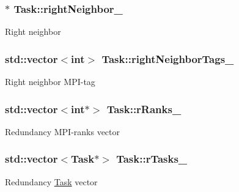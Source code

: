 \subsubsection[{\texorpdfstring{right\+Neighbor\+\_\+}{rightNeighbor_}}]{$\ast$ Task\+::right\+Neighbor\+\_\+\hspace{0.3cm}{\ttfamily [private]}}\hypertarget{classTask_aa6d859faf14ed3e950923562dba9d848}{}\label{classTask_aa6d859faf14ed3e950923562dba9d848}
Right neighbor 
\subsubsection[{\texorpdfstring{right\+Neighbor\+Tags\+\_\+}{rightNeighborTags_}}]{\setlength{\rightskip}{0pt plus 5cm}std\+::vector$<$int$>$ Task\+::right\+Neighbor\+Tags\+\_\+\hspace{0.3cm}{\ttfamily [private]}}\hypertarget{classTask_a3a426a21f7ba4c4f91479207f96d6a66}{}\label{classTask_a3a426a21f7ba4c4f91479207f96d6a66}
Right neighbor M\+P\+I-\/tag 
\subsubsection[{\texorpdfstring{r\+Ranks\+\_\+}{rRanks_}}]{\setlength{\rightskip}{0pt plus 5cm}std\+::vector$<$int$\ast$$>$ Task\+::r\+Ranks\+\_\+\hspace{0.3cm}{\ttfamily [private]}}\hypertarget{classTask_a0770f08a9273b858cdcc8c4555fa0291}{}\label{classTask_a0770f08a9273b858cdcc8c4555fa0291}
Redundancy M\+P\+I-\/ranks vector 
\subsubsection[{\texorpdfstring{r\+Tasks\+\_\+}{rTasks_}}]{\setlength{\rightskip}{0pt plus 5cm}std\+::vector$<${\bf Task}$\ast$$>$ Task\+::r\+Tasks\+\_\+\hspace{0.3cm}{\ttfamily [private]}}\hypertarget{classTask_a4a6d7ba7f0f194053af5ff7ca236f761}{}\label{classTask_a4a6d7ba7f0f194053af5ff7ca236f761}
Redundancy \hyperlink{classTask}{Task} vector 
